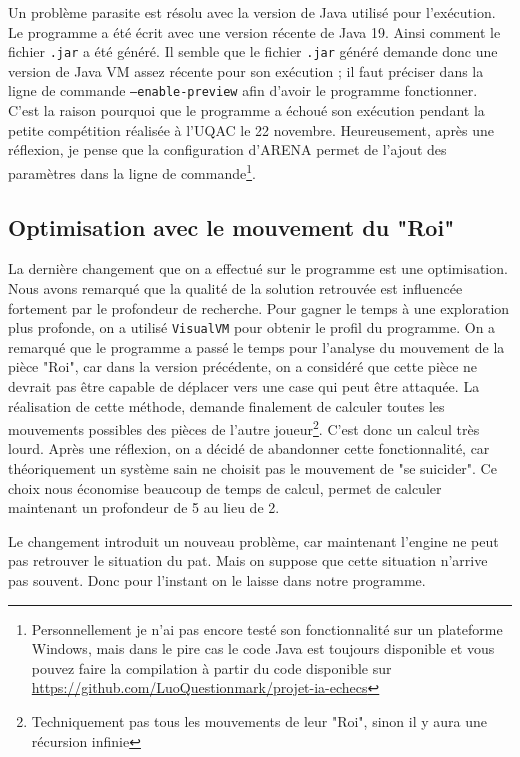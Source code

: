 \documentclass{article}
\begin{document}
\par Un problème parasite est résolu avec la version de Java utilisé pour l'exécution. Le programme a été écrit avec une version récente de Java 19. Ainsi comment le fichier \texttt{.jar} a été généré. Il semble que le fichier \texttt{.jar} généré demande donc une version de Java VM assez récente pour son exécution ; il faut préciser dans la ligne de commande \texttt{--enable-preview} afin d'avoir le programme fonctionner. C'est la raison pourquoi que le programme a échoué son exécution pendant la petite compétition réalisée à l'UQAC le 22 novembre. Heureusement, après une réflexion, je pense que la configuration d'ARENA permet de l'ajout des paramètres dans la ligne de commande\footnote{Personnellement je n'ai pas encore testé son fonctionnalité sur un plateforme Windows, mais dans le pire cas le code Java est toujours disponible et vous pouvez faire la compilation à partir du code disponible sur \url{https://github.com/LuoQuestionmark/projet-ia-echecs}}.

\subsection{Optimisation avec le mouvement du "Roi"}\label{sect:bug}

\par La dernière changement que on a effectué sur le programme est une optimisation. Nous avons remarqué que la qualité de la solution retrouvée est influencée fortement par le profondeur de recherche. Pour gagner le temps à une exploration plus profonde, on a utilisé \texttt{VisualVM} pour obtenir le profil du programme. On a remarqué que le programme a passé le temps pour l'analyse du mouvement de la pièce "Roi", car dans la version précédente, on a considéré que cette pièce ne devrait pas être capable de déplacer vers une case qui peut être attaquée. La réalisation de cette méthode, demande finalement de calculer toutes les mouvements possibles des pièces de l'autre joueur\footnote{Techniquement pas tous les mouvements de leur "Roi", sinon il y aura une récursion infinie}. C'est donc un calcul très lourd. Après une réflexion, on a décidé de abandonner cette fonctionnalité, car théoriquement un système sain ne choisit pas le mouvement de "se suicider". Ce choix nous économise beaucoup de temps de calcul, permet de calculer maintenant un profondeur de 5 au lieu de 2.

\par Le changement introduit un nouveau problème, car maintenant l'engine ne peut pas retrouver le situation du pat\cite{frwiki:pat}. Mais on suppose que cette situation n'arrive pas souvent. Donc pour l'instant on le laisse dans notre programme.
\end{document}
